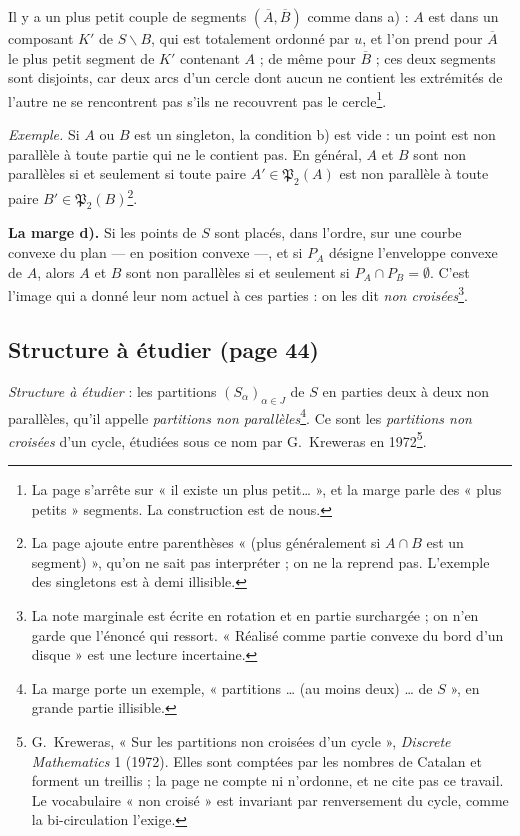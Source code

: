 \documentclass[11pt,a4paper]{article}
\begin{document}
Il y a un plus petit couple de segments $(\overline{A}, \overline{B})$ comme
dans a) : $A$ est dans un composant $K'$ de $S \smallsetminus B$, qui est
totalement ordonné par $u$, et l'on prend pour $\overline{A}$ le plus petit
segment de $K'$ contenant $A$ ; de même pour $\overline{B}$ ; ces deux
segments sont disjoints, car deux arcs d'un cercle dont aucun ne contient
les extrémités de l'autre ne se rencontrent pas s'ils ne recouvrent pas le
cercle\footnote{La page s'arrête sur « il existe un plus petit… », et la
marge parle des « plus petits » segments. La construction est de nous.}.

\emph{Exemple.} Si $A$ ou $B$ est un singleton, la condition b) est vide :
un point est non parallèle à toute partie qui ne le contient pas. En
général, $A$ et $B$ sont non parallèles si et seulement si toute paire
$A' \in \mathfrak{P}_2(A)$ est non parallèle à toute paire $B' \in
\mathfrak{P}_2(B)$\footnote{La page ajoute entre parenthèses « (plus
généralement si $A \cap B$ est un segment) », qu'on ne sait pas
interpréter ; on ne la reprend pas. L'exemple des singletons est à demi
illisible.}.

\textbf{La marge d).} Si les points de $S$ sont placés, dans l'ordre,
sur une courbe convexe du plan --- en position convexe ---, et si $P_A$
désigne l'enveloppe convexe de $A$, alors $A$ et $B$ sont non parallèles si
et seulement si $P_A \cap P_B = \emptyset$. C'est l'image qui a donné leur
nom actuel à ces parties : on les dit \emph{non croisées}\footnote{La note
marginale est écrite en rotation et en partie surchargée ; on n'en garde que
l'énoncé qui ressort. « Réalisé comme partie convexe du bord d'un disque » est
une lecture incertaine.}.

\subsection*{Structure à étudier (page 44)}

\emph{Structure à étudier} : les partitions $(S_\alpha)_{\alpha \in J}$ de
$S$ en parties deux à deux non parallèles, qu'il appelle \emph{partitions non
parallèles}\footnote{La marge porte un exemple, « partitions … (au moins
deux) … de $S$ », en grande partie illisible.}. Ce sont les \emph{partitions non croisées} d'un cycle, étudiées
sous ce nom par G.~Kreweras en 1972\footnote{G.~Kreweras, « Sur les
partitions non croisées d'un cycle », \emph{Discrete Mathematics} 1 (1972).
Elles sont comptées par les nombres de Catalan et forment un treillis ; la
page ne compte ni n'ordonne, et ne cite pas ce travail. Le vocabulaire « non croisé » est invariant par renversement du
cycle, comme la bi-circulation l'exige.}.
\end{document}
